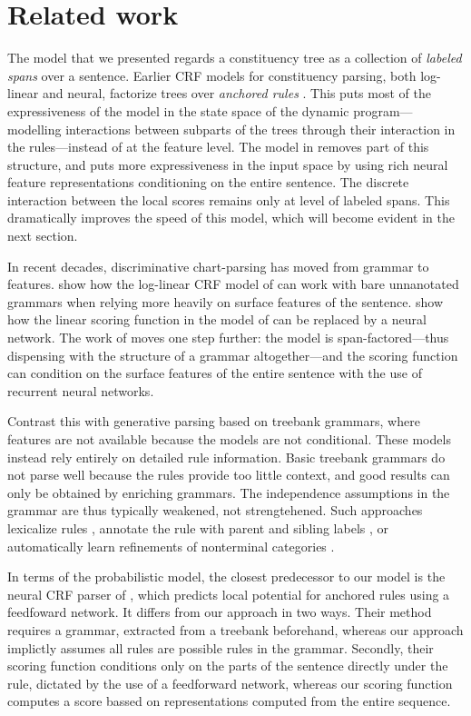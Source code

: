 \section{Related work}
  The model that we presented regards a constituency tree as a collection of \textit{labeled spans} over a sentence. Earlier CRF models for constituency parsing, both log-linear and neural, factorize trees over \textit{anchored rules} \citep{finkel2008crf,klein2015crf}. This puts most of the expressiveness of the model in the state space of the dynamic program---modelling interactions between subparts of the trees through their interaction in the rules---instead of at the feature level. The model in \citet{stern2017minimal} removes part of this structure, and puts more expressiveness in the input space by using rich neural feature representations conditioning on the entire sentence. The discrete interaction between the local scores remains only at level of labeled spans. This dramatically improves the speed of this model, which will become evident in the next section.

  In recent decades, discriminative chart-parsing has moved from grammar to features. \citet{hall2014less} show how the log-linear CRF model of \cite{finkel2008crf} can work with bare unnanotated grammars when relying more heavily on surface features of the sentence. \citet{klein2015crf} show how the linear scoring function in the model of \citet{hall2014less} can be replaced by a neural network. The work of \citep{stern2017minimal} moves one step further: the model is span-factored---thus dispensing with the structure of a grammar altogether---and the scoring function can condition on the surface features of the entire sentence with the use of recurrent neural networks.

  Contrast this with generative parsing based on treebank grammars, where features are not available because the models are not conditional. These models instead rely entirely on detailed rule information. Basic treebank grammars do not parse well because the rules provide too little context, and good results can only be obtained by enriching grammars. The independence assumptions in the grammar are thus typically weakened, not strengtehened. Such approaches lexicalize rules \citep{collins2003head}, annotate the rule with parent and sibling labels \citep{klein2003accurate}, or automatically learn refinements of nonterminal categories \citep{petrov2006learning}.

  In terms of the probabilistic model, the closest predecessor to our model is the neural CRF parser of \citet{klein2015crf}, which predicts local potential for anchored rules using a feedfoward network. It differs from our approach in two ways. Their method requires a grammar, extracted from a treebank beforehand, whereas our approach implictly assumes all rules are possible rules in the grammar. Secondly, their scoring function conditions only on the parts of the sentence directly under the rule, dictated by the use of a feedforward network, whereas our scoring function computes a score bassed on representations computed from the entire sequence.

